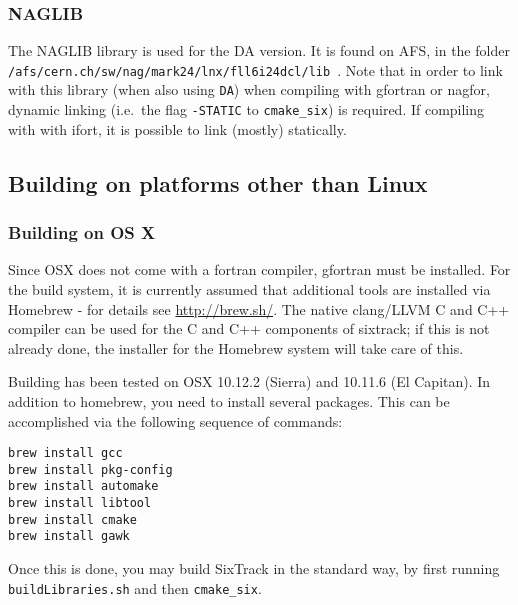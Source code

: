 \documentclass[english,BCOR=0mm,DIV=18]{scrartcl}
\begin{document}
\subsubsection{NAGLIB}
\label{sec:building:libs:naglib}
The NAGLIB library  is used for the DA version.
It is found on AFS, in the folder \texttt{/afs/cern.ch/sw/nag/mark24/lnx/fll6i24dcl/lib}~.
Note that in order to link with this library (when also using \texttt{DA}) when compiling with gfortran or nagfor, dynamic linking (i.e.\ the flag \texttt{-STATIC} to \texttt{cmake\_six}) is required.
If compiling with with ifort, it is possible to link (mostly) statically.

\subsection{Building on platforms other than Linux}

\subsubsection{Building on OS X}

Since OSX does not come with a fortran compiler, gfortran must be installed.
For the build system, it is currently assumed that additional tools are installed via Homebrew - for details see \url{http://brew.sh/}.
The native clang/LLVM C and C++ compiler can be used for the C and C++ components of sixtrack; if this is not already done, the installer for the Homebrew system will take care of this.

Building has been tested on OSX 10.12.2 (Sierra) and 10.11.6 (El Capitan).
In addition to homebrew, you need to install several packages.
This can be accomplished via the following sequence of commands:
\begin{lstlisting}
brew install gcc
brew install pkg-config
brew install automake
brew install libtool
brew install cmake
brew install gawk
\end{lstlisting}
Once this is done, you may build SixTrack in the standard way, by first running \texttt{buildLibraries.sh} and then \texttt{cmake\_six}.

\end{document}
